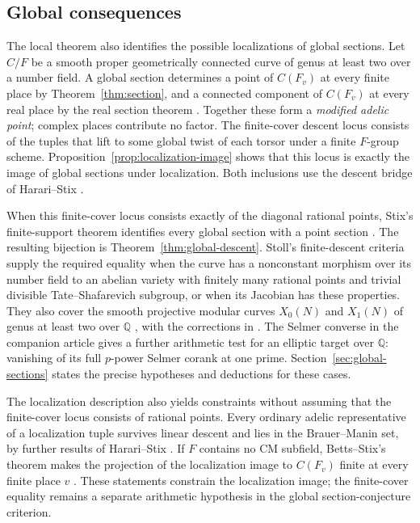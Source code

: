 \subsection{Global consequences}

The local theorem also identifies the possible localizations of global
sections. Let $C/F$ be a smooth proper geometrically connected curve of
genus at least two over a number field. A global section determines a
point of $C(F_v)$ at every finite place by Theorem~\ref{thm:section},
and a connected component of $C(F_v)$ at every real place by the real
section theorem \cite[Introduction, Theorem]{BrescianiVistoliReal}.
Together these form a \emph{modified adelic point}; complex places
contribute no factor. The finite-cover descent locus consists of the
tuples that lift to some global twist of each torsor under a finite
$F$-group scheme. Proposition~\ref{prop:localization-image} shows that
this locus is exactly the image of global sections under localization.
Both inclusions use the descent bridge of Harari--Stix
\cite[preprint version, Theorem~2.1 and Remark~2.2(1)]{HarariStixFiniteDescent}.

When this finite-cover locus consists exactly of the diagonal rational
points, Stix's finite-support theorem identifies every global section
with a point section
\cite[arXiv version, Corollary~5]{StixFiniteSupport}.
The resulting bijection is Theorem~\ref{thm:global-descent}.
Stoll's finite-descent criteria supply the required equality when the
curve has a nonconstant morphism over its number field to an abelian
variety with finitely many rational points and trivial divisible
Tate--Shafarevich subgroup, or when its Jacobian has these properties.
They also cover the smooth projective modular curves $X_0(N)$ and
$X_1(N)$ of genus at least two over $\mathbb Q$
\cite[Corollary~8.1, Theorem~8.6, and Corollary~8.8]{StollFiniteDescent},
with the corrections in \cite{StollFiniteDescentErrata}.
The Selmer converse in the companion article
\cite[Theorem~1.1]{OpenAISelmerConverse2026} gives a further arithmetic
test for an elliptic target over $\mathbb Q$: vanishing of its full
$p$-power Selmer corank at one prime.
Section~\ref{sec:global-sections} states the precise hypotheses and
deductions for these cases.

The localization description also yields constraints without assuming
that the finite-cover locus consists of rational points. Every ordinary
adelic representative of a localization tuple survives linear descent
and lies in the Brauer--Manin set, by further results of Harari--Stix
\cite[preprint version, Corollary~3.1 and Theorem~4.1]{HarariStixFiniteDescent}.
If $F$ contains no CM subfield, Betts--Stix's theorem makes the projection
of the localization image to $C(F_v)$ finite at every finite place $v$
\cite[preprint version, Theorem~A]{BettsStix}.
These statements constrain the localization image; the finite-cover
equality remains a separate arithmetic hypothesis in the global
section-conjecture criterion.
